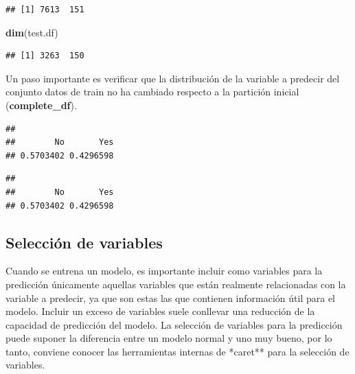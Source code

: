 \documentclass[
]{article}
\newenvironment{Shaded}{\begin{snugshade}}{\end{snugshade}}
\newcommand{\KeywordTok}[1]{\textcolor[rgb]{0.13,0.29,0.53}{\textbf{#1}}}
\newcommand{\NormalTok}[1]{#1}
\newcommand{\OperatorTok}[1]{\textcolor[rgb]{0.81,0.36,0.00}{\textbf{#1}}}
\begin{document}
\begin{verbatim}
## [1] 7613  151
\end{verbatim}

\begin{Shaded}
\begin{Highlighting}[]
\KeywordTok{dim}\NormalTok{(test.df)}
\end{Highlighting}
\end{Shaded}

\begin{verbatim}
## [1] 3263  150
\end{verbatim}

Un paso importante es verificar que la distribución de la variable a
predecir del conjunto datos de train no ha cambiado respecto a la
partición inicial (\textbf{complete\_df}).

\begin{Shaded}
\end{Shaded}

\begin{verbatim}
## 
##        No       Yes 
## 0.5703402 0.4296598
\end{verbatim}

\begin{Shaded}
\end{Shaded}

\begin{verbatim}
## 
##        No       Yes 
## 0.5703402 0.4296598
\end{verbatim}

\hypertarget{selecciuxf3n-de-variables}{%
\subsection{Selección de variables}\label{selecciuxf3n-de-variables}}

Cuando se entrena un modelo, es importante incluir como variables para
la predicción únicamente aquellas variables que están realmente
relacionadas con la variable a predecir, ya que son estas las que
contienen información útil para el modelo. Incluir un exceso de
variables suele conllevar una reducción de la capacidad de predicción
del modelo. La selección de variables para la predicción puede suponer
la diferencia entre un modelo normal y uno muy bueno, por lo tanto,
conviene conocer las herramientas internas de *caret** para la selección
de variables.
\end{document}
